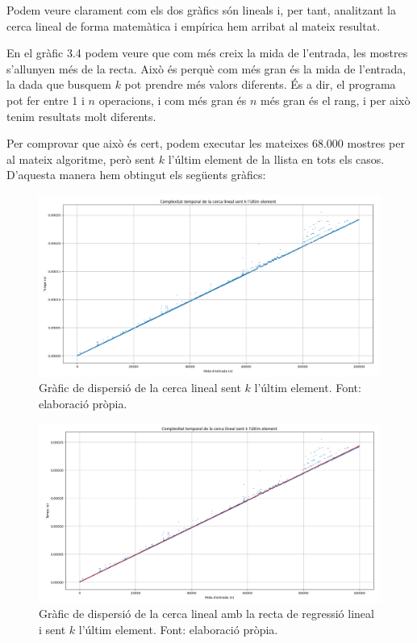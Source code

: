 Podem veure clarament com els dos gràfics són lineals i, per tant, analitzant la cerca lineal de forma matemàtica i empírica hem arribat al mateix resultat.

En el gràfic 3.4 podem veure que com més creix la mida de l'entrada, les mostres s'allunyen més de la recta. Això és perquè com més gran és la mida de l'entrada, la dada que busquem $k$ pot prendre més valors diferents. És a dir, el programa pot fer entre 1 i $n$ operacions, i com més gran és $n$ més gran és el rang, i per això tenim resultats molt diferents. 

Per comprovar que això és cert, podem executar les mateixes 68.000 mostres per al mateix algoritme, però sent $k$ l'últim element de la llista en tots els casos. D'aquesta manera hem obtingut els següents gràfics:
\begin{figure}[H]
    \centering
    \includegraphics[width=1\textwidth]{capitols/figures/llinerascatter.png}
    \caption[Gràfic de dispersió de la cerca lineal sent $k$ l'últim element.]{Gràfic de dispersió de la cerca lineal sent $k$ l'últim element. Font: elaboració pròpia.}
    \label{fig:my_label}
\end{figure}
\begin{figure}[H]
    \centering
    \includegraphics[width=1\textwidth]{capitols/figures/llinearscatterline.png}
    \caption[Gràfic de dispersió de la cerca lineal amb la recta de regressió lineal i sent $k$ l'últim element.]{Gràfic de dispersió de la cerca lineal amb la recta de regressió lineal i sent $k$ l'últim element. Font: elaboració pròpia.}
    \label{fig:my_label}
\end{figure}

